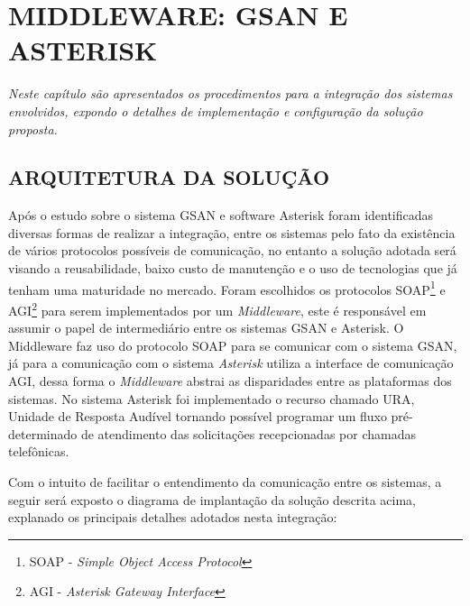 \chapter[Middleware: GSAN e Asterisk]{\textbf{\uppercase{Middleware: Gsan e Asterisk}}}

\textit{Neste capítulo são apresentados os procedimentos para a integração dos sistemas envolvidos, expondo o detalhes de implementação e configuração da solução proposta.}


\section{\uppercase{Arquitetura da Solução}}

Após o estudo sobre o sistema GSAN e software Asterisk foram identificadas diversas formas de realizar a integração, entre os sistemas pelo fato da existência de vários protocolos possíveis de comunicação, no entanto a solução adotada será visando a reusabilidade, baixo custo de manutenção e o uso de tecnologias que já tenham uma maturidade no mercado. Foram escolhidos os protocolos SOAP\footnote{SOAP - \textit{Simple Object Access Protocol}} e AGI\footnote{AGI - \textit{Asterisk Gateway Interface}} para serem implementados por um \textit{Middleware}, este é responsável em assumir o papel de intermediário entre os sistemas GSAN e Asterisk. O Middleware faz uso do protocolo SOAP para se comunicar com o sistema GSAN, já para a comunicação com o sistema \textit{Asterisk} utiliza a interface de comunicação AGI, dessa forma o \textit{Middleware} abstrai as disparidades entre as plataformas dos sistemas. No sistema Asterisk foi implementado o recurso chamado URA, Unidade de Resposta Audível tornando possível programar um fluxo pré-determinado de atendimento das solicitações recepcionadas por chamadas telefônicas.

Com o intuito de facilitar o entendimento da comunicação entre os sistemas, a seguir será exposto o diagrama de implantação da solução descrita acima, explanado os principais detalhes adotados nesta integração:


